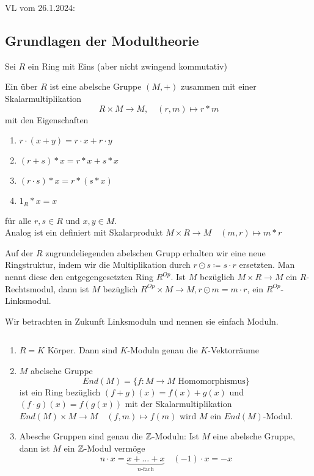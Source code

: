 \documentclass[../main.tex]{subfiles}
\begin{document}
\begin{flushright}
VL vom 26.1.2024:
\end{flushright}
\subsection{Grundlagen der Modultheorie}
Sei $R$ ein Ring mit Eins (aber nicht zwingend kommutativ)

\begin{definition}
    Ein  über $R$ ist eine abelsche Gruppe $(M,+)$ zusammen mit einer Skalarmultiplikation
    $$R\times M\rightarrow M,\quad (r,m)\mapsto r * m$$
    mit den Eigenschaften
    \begin{enumerate}[label=(\roman*)]
        \item $r\cdot (x+y) = r\cdot x + r\cdot y$
        \item $(r+s)* x = r * x + s * x$
        \item $(r\cdot s) * x = r * (s*x)$
        \item $1_R * x = x$
    \end{enumerate}
    für alle $r,s\in R$ und $x,y\in M$.\\
    Analog ist ein  definiert mit Skalarprodukt $M\times R\rightarrow M\quad (m,r)\mapsto m * r$
\end{definition}

\begin{remark}
    Auf der $R$ zugrundeliegenden abelschen Grupp erhalten wir eine neue Ringstruktur, indem wir die Multiplikation durch $r\odot s \coloneqq s\cdot r$ ersetzten.
    Man nennt diese den entgegengesetzten Ring $R^{Op}$. Ist $M$ bezüglich $M\times R\rightarrow M$ ein $R$-Rechtsmodul, dann ist $M$ bezüglich $R^{Op}\times M\rightarrow M, r\odot m= m\cdot r$, ein $R^{Op}$-Linksmodul.
\end{remark}
Wir betrachten in Zukunft Linksmoduln und nennen sie einfach Moduln.
\begin{example} $ $
    \begin{enumerate}[label=(\arabic*)]
        \item $R=K$ Körper. Dann sind $K$-Moduln genau die $K$-Vektorräume
        \item $M$ abelsche Gruppe
        $$End(M) = \{f:M\rightarrow M \text{ Homomorphismus}\}$$
        ist ein Ring bezüglich $(f+g)(x) = f(x) + g(x)$ und $(f\cdot g)(x) = f(g(x))$ mit der Skalarmultiplikation $End(M)\times M \rightarrow M\quad (f,m)\mapsto f(m)$ wird $M$ ein $End(M)$-Modul.
        \item Abesche Gruppen sind genau die $\mathbb{Z}$-Moduln:
        Ist $M$ eine abelsche Gruppe, dann ist $M$ ein $\mathbb{Z}$-Modul vermöge
        $$n\cdot x = \underbrace{x+\dots+x}_{n\text{-fach}} \quad (-1)\cdot x = -x$$
    \end{enumerate}
\end{example}
\end{document}
